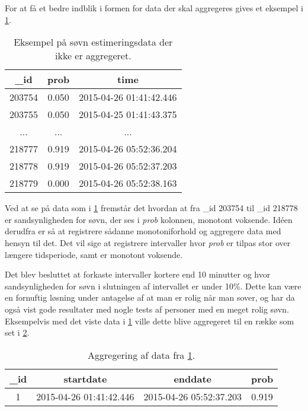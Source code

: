 For at få et bedre indblik i formen for data der skal aggregeres gives et eksempel i \cref{tab:noaggsoevndata}.
\begin{table}[h]
	\centering
\begin{tabular}{|c|c|c|}
	\hline {\_}id & prob & time \\ 
	\hline 203754 & 0.050 & 2015-04-26 01:41:42.446 \\ 
	\hline 203755 & 0.050 & 2015-04-25 01:41:43.375 \\ 
	\hline ... & ... & ... \\ 
	\hline 218777 & 0.919 & 2015-04-26 05:52:36.204 \\ 
	\hline 218778 & 0.919 & 2015-04-26 05:52:37.203 \\ 
	\hline 218779 & 0.000 & 2015-04-26 05:52:38.163 \\ 
	\hline 
\end{tabular}
\caption{Eksempel på søvn estimeringsdata der ikke er aggregeret.}\label{tab:noaggsoevndata}
\end{table}
Ved at se på data som i \cref{tab:noaggsoevndata} fremstår det hvordan at fra {\_}id 203754 til {\_}id 218778 er sandsynligheden for søvn, der ses i \textit{prob} kolonnen, monotont voksende.
Idéen derudfra er så at registrere sådanne monotoniforhold og aggregere data med hensyn til det.
Det vil sige at registrere intervaller hvor \textit{prob} er tilpas stor over længere tidsperiode, samt er monotont voksende.

Det blev besluttet at forkaste intervaller kortere end 10 minutter og hvor sandsynligheden for søvn i slutningen af intervallet er under 10\%.
Dette kan være en fornuftig løsning under antagelse af at man er rolig når man sover, og har da også vist gode resultater med nogle tests af personer med en meget rolig søvn. 
Eksempelvis med det viste data i \cref{tab:noaggsoevndata} ville dette blive aggregeret til en række som set i \cref{tab:aggdat}.

\begin{table}[h]
	\centering
\begin{tabular}{|c|c|c|c|}
	\hline {\_}id & startdate & enddate & prob \\ 
	\hline 1 & 2015-04-26 01:41:42.446 &  2015-04-26 05:52:37.203 & 0.919 \\ 
	\hline 
\end{tabular} 
\caption{Aggregering af data fra \cref{tab:noaggsoevndata}.}\label{tab:aggdat}
\end{table}

